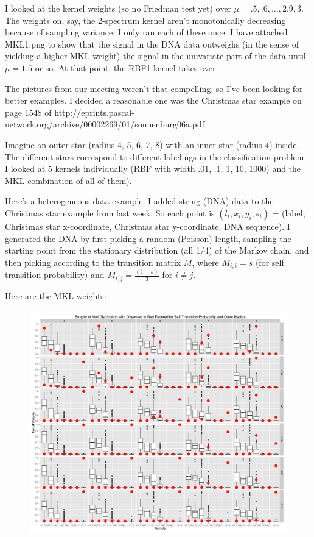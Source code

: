 I looked at the kernel weights (so no Friedman test yet) over $\mu = .5,
.6, \ldots, 2.9, 3$.  The weights on, say, the 2-spectrum kernel aren't
monotonically decreasing because of sampling variance: I only ran each
of these once.  I have attached MKL1.png to show that the signal in
the DNA data outweighs (in the sense of yielding a higher MKL weight)
the signal in the univariate part of the data until $\mu = 1.5$ or so.
At that point, the RBF1 kernel takes over.

The pictures from our meeting weren't that compelling, so I've been
looking for better examples.  I decided a reasonable one was the
Christmas star example on page 1548 of
http://eprints.pascal-network.org/archive/00002269/01/sonnenburg06a.pdf

Imagine an outer star (radius 4, 5, 6, 7, 8) with an inner star
(radius 4) inside.  The different stars correspond to different
labelings in the classification problem.  I looked at 5 kernels
individually (RBF with width .01, .1, 1, 10, 1000) and the MKL
combination of all of them).

Here's a heterogeneous data example.  I added string (DNA) data to the
Christmas star example from last week.  So each point is $(l_i, x_i,
y_i, s_i)$ = (label, Christmas star x-coordinate, Christmas star
y-coordinate, DNA sequence).  I generated the DNA by first picking a
random (Poisson) length, sampling the starting point from the
stationary distribution (all 1/4) of the Markov chain, and then
picking according to the transition matrix $M$, where $M_{i,i} = s$ (for
self transition probability) and $M_{i,j} = \frac{(1 - s)}{3}$ for $i \neq j$.

Here are the MKL weights:
\begin{figure}[!ht]
  \centering
    \includegraphics[scale=.3]{mkl_weight_boxplot_christmas_star_DNA.png}
\end{figure}

